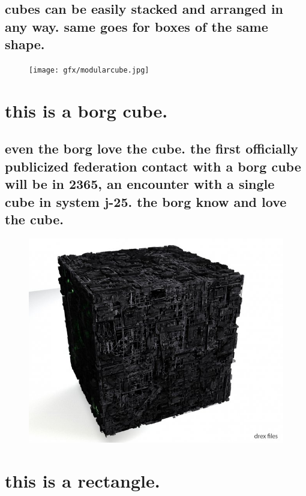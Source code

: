 \documentclass[paper=128mm:96mm, fontsize=9pt, pagesize]{scrartcl}
\begin{document}
\subsection{cubes can be easily stacked and arranged in any way.  same goes for boxes of the same shape.}
\begin{figure}
	\centering
	\texttt{[image: gfx/modularcube.jpg]}
\end{figure}

\clearpage

\section{this is a borg cube.}
\subsection{even the borg love the cube.  the first officially publicized federation contact with a borg cube will be in 2365, an encounter with a single cube in system j-25.  the borg know and love the cube.}
\begin{figure}
	\centering
	\includegraphics[height=.5\textheight]{gfx/borgbox.jpg}
\end{figure}

\clearpage

\section{this is a rectangle.}
\end{document}
